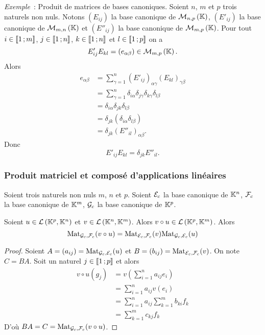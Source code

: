\emph{Exemple}~: Produit de matrices de bases canoniques. Soient \(n\), \(m\) et
\(p\) trois naturels non nuls. Notons \((E_{ij})\) la base canonique de
\(\mathcal{M}_{n,p}\left(\mathbb{K}\right)\), \((E'_{ij})\) la base canonique de \(\mathcal{M}_{m,n}\left(\mathbb{K}\right)\) et
\((E''_{ij})\) la base canonique de \(\mathcal{M}_{m,p}\left(\mathbb{K}\right)\). Pour tout \(i \in
\mathopen{\llbracket}1\mathclose{}\mathpunct{};m\mathclose{\rrbracket}\), \(j \in \mathopen{\llbracket}1\mathclose{}\mathpunct{};n\mathclose{\rrbracket}\), \(k \in
\mathopen{\llbracket}1\mathclose{}\mathpunct{};n\mathclose{\rrbracket}\) et \(l \in \mathopen{\llbracket}1\mathclose{}\mathpunct{};p\mathclose{\rrbracket}\) on a
\begin{equation}
  E'_{ij} E_{kl} =(e_{\alpha \beta}) \in \mathcal{M}_{m,p}\left(\mathbb{K}\right).
\end{equation}
Alors
\begin{align*}
  {e}_{\alpha \beta} &=\sum_{\gamma=1}^n {({E'}_{ij})}_{\alpha \gamma}
  {({E}_{kl})}_{\gamma \beta}\\
  &=\sum_{\gamma=1}^n \delta_{i\alpha} \delta_{j\gamma} \delta_{k\gamma}
  \delta_{l\beta} \\
  &= \delta_{i\alpha} \delta_{jk} \delta_{l\beta}\\
  &= \delta_{jk} (\delta_{i\alpha} \delta_{l\beta})\\
  &= \delta_{jk} ({E''}_{il})_{\alpha\beta}.
\end{align*}
Donc
\begin{equation}
  {E'}_{ij} {E}_{kl} = \delta_{jk} {E''}_{il}.
\end{equation}

\subsubsection{Produit matriciel et composé d'applications linéaires}

Soient trois naturels non nuls \(m\), \(n\) et \(p\). Soient \(\mathcal{E}_c\) la base
canonique de \(\mathbb{K}^n\), \(\mathcal{F}_c\) la base canonique de \(\mathbb{K}^m\),  \(\mathcal{G}_c\) la
base canonique de \(\mathbb{K}^p\).

\begin{prop}
  Soient \(u \in \mathcal{L}\left(\mathbb{K}^p,\mathbb{K}^n\right)\) et \(v \in \mathcal{L}\left(\mathbb{K}^n,\mathbb{K}^m\right)\). Alors \(v
  \circ u \in \mathcal{L}\left(\mathbb{K}^p,\mathbb{K}^m\right)\). Alors
  \begin{equation}
    \mathrm{Mat}_{\mathcal{G}_c,\mathcal{F}_c}(v \circ u) = \mathrm{Mat}_{\mathcal{E}_c,\mathcal{F}_c}(v) \mathrm{Mat}_{\mathcal{G}_c,\mathcal{E}_c}(u)
  \end{equation}
\end{prop}
\begin{proof}
  Soient \(A= (a_{ij})=\mathrm{Mat}_{\mathcal{G}_c,\mathcal{E}_c}(u)\) et \(B=(b_{ij})=
  \mathrm{Mat}_{\mathcal{E}_c,\mathcal{F}_c}(v)\). On note \(C=BA\). Soit un naturel \(j \in
  \mathopen{\llbracket}1\mathclose{}\mathpunct{};p\mathclose{\rrbracket}\) et alors
  \begin{align*}
    v \circ u (g_j) &= v\left( \sum_{i=1}^n a_{ij} e_i\right) \\
    &=\sum_{i=1}^n a_{ij} v(e_i) \\
    &=\sum_{i=1}^n a_{ij} \sum_{k=1}^m b_{ki} f_k \\
    &=\sum_{k=1}^m c_{kj} f_k
  \end{align*}
  D'où \(BA=C=\mathrm{Mat}_{\mathcal{G}_c,\mathcal{F}_c}(v \circ u)\).
\end{proof}

